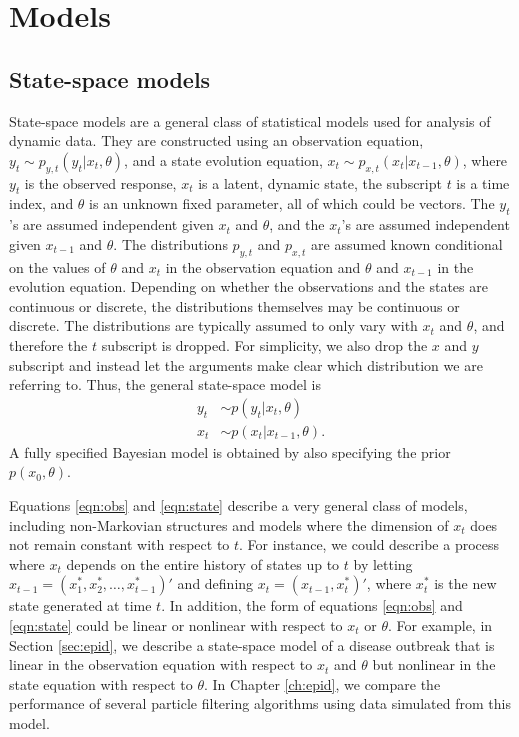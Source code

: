 \chapter{Models \label{ch:models}}

\section{State-space models \label{sec:ss}}

State-space models are a general class of statistical models used for analysis of dynamic data.  They are constructed using an observation equation, $y_t \sim p_{y,t}(y_t|x_t,\theta)$, and a state evolution equation, $x_t \sim p_{x,t}(x_t|x_{t-1},\theta)$, where $y_t$ is the observed response, $x_t$ is a latent, dynamic state, the subscript $t$ is a time index, and $\theta$ is an unknown fixed parameter, all of which could be vectors. The $y_t$'s are assumed independent given $x_t$ and $\theta$, and the $x_t$'s are assumed independent given $x_{t-1}$ and $\theta$. The distributions $p_{y,t}$ and $p_{x,t}$ are assumed known conditional on the values of $\theta$ and $x_t$ in the observation equation and $\theta$ and $x_{t-1}$ in the evolution equation. Depending on whether the observations and the states are continuous or discrete, the distributions themselves may be continuous or discrete. The distributions are typically assumed to only vary with $x_t$ and $\theta$, and therefore the $t$ subscript is dropped. For simplicity, we also drop the $x$ and $y$ subscript and instead let the arguments make clear which distribution we are referring to. Thus, the general state-space model is
\begin{align}
y_t &\sim p(y_t|x_t,\theta) \label{eqn:obs} \\
x_t &\sim p(x_t|x_{t-1},\theta). \label{eqn:state}
\end{align}
A fully specified Bayesian model is obtained by also specifying the prior $p(x_0,\theta)$.

Equations \eqref{eqn:obs} and \eqref{eqn:state} describe a very general class of models, including non-Markovian structures and models where the dimension of $x_t$ does not remain constant with respect to $t$. For instance, we could describe a process where $x_t$ depends on the entire history of states up to $t$ by letting $x_{t-1} = (x^*_1, x^*_2, \ldots, x^*_{t-1})'$ and defining $x_t = (x_{t-1}, x^*_t)'$, where $x^*_t$ is the new state generated at time $t$. In addition, the form of equations \eqref{eqn:obs} and \eqref{eqn:state} could be linear or nonlinear with respect to $x_t$ or $\theta$. For example, in Section \ref{sec:epid}, we describe a state-space model of a disease outbreak that is linear in the observation equation with respect to $x_t$ and $\theta$ but nonlinear in the state equation with respect to $\theta$. In Chapter \ref{ch:epid}, we compare the performance of several particle filtering algorithms using data simulated from this model.

